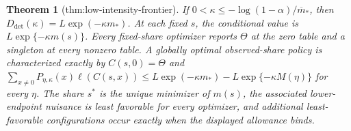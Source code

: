 \documentclass{article}
\newtheorem{theorem}{Theorem}
\begin{document}
\begin{theorem}[thm:low-intensity-frontier]\label{thm:low-intensity-frontier}
If \(0<\kappa\le-\log(1-\alpha)/\overline m_*\), then \(D_{\mathrm{det}}(\kappa)=L\exp(-\kappa m_*)\). At each fixed \(s\), the conditional value is \(L\exp\{-\kappa m(s)\}\). Every fixed-share optimizer reports \(\Theta\) at the zero table and a singleton at every nonzero table. A globally optimal observed-share policy is characterized exactly by \(C(s,0)=\Theta\) and \(\sum_{x\ne0}P_{\eta,\kappa}(x)\ell(C(s,x))\le L\exp(-\kappa m_*)-L\exp\{-\kappa M(\eta)\}\) for every \(\eta\). The share \(s^*\) is the unique minimizer of \(m(s)\), the associated lower-endpoint nuisance is least favorable for every optimizer, and additional least-favorable configurations occur exactly when the displayed allowance binds.
\end{theorem}
\end{document}
